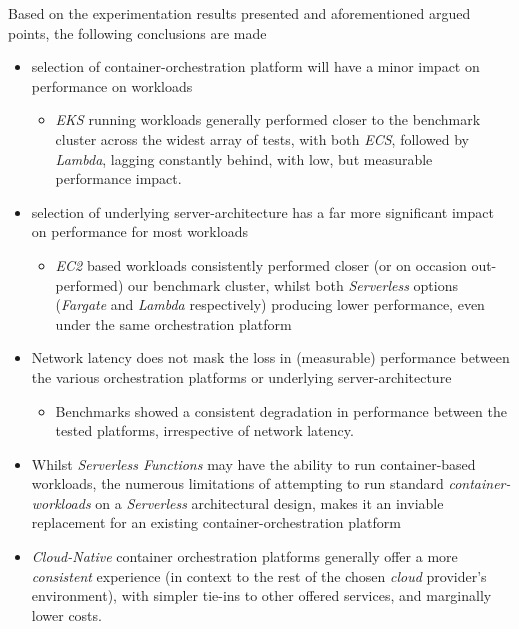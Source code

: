 \noindent Based on the experimentation results presented and aforementioned argued points, the following conclusions are made
\begin{itemize}
      \item selection of container-orchestration platform will have a minor impact on performance on workloads
            \begin{itemize}
                  \item \textit{EKS} running workloads generally performed closer to the benchmark cluster across the widest array of tests,
                        with both \textit{ECS}, followed by \textit{Lambda}, lagging constantly behind, with low, but measurable performance impact.
            \end{itemize}
      \item selection of underlying server-architecture has a far more significant impact on performance for most workloads
            \begin{itemize}
                  \item \textit{EC2} based workloads consistently performed closer (or on occasion out-performed) our benchmark cluster,
                        whilst both \textit{Serverless} options (\textit{Fargate} and \textit{Lambda} respectively) producing lower performance,
                        even under the same orchestration platform
            \end{itemize}
      \item Network latency does not mask the loss in (measurable) performance between the various orchestration platforms or underlying server-architecture
            \begin{itemize}
                  \item Benchmarks showed a consistent degradation in performance between the tested platforms, irrespective of network latency.
            \end{itemize}
      \item Whilst \textit{Serverless Functions} may have the ability to run container-based workloads,
            the numerous limitations of attempting to run standard \textit{container-workloads} on a
            \textit{Serverless} architectural design, makes it an inviable replacement for an existing container-orchestration platform
      \item \textit{Cloud-Native} container orchestration platforms generally offer a more \emph{consistent} experience
            (in context to the rest of the chosen \textit{cloud} provider's environment), with simpler tie-ins to other offered services, and marginally lower costs.

\end{itemize}
